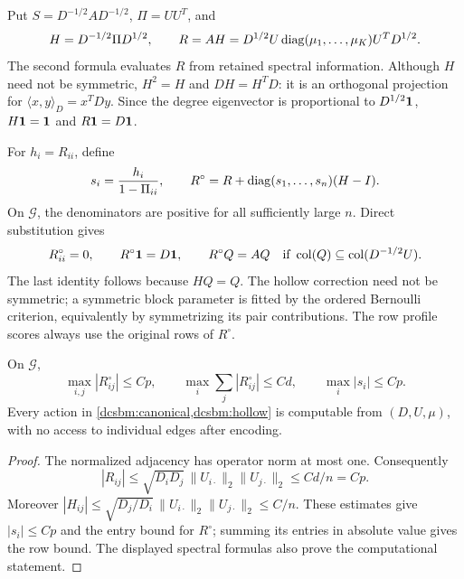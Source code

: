 Put \(S=D^{-1/2}AD^{-1/2}\), \(\Pi=UU^T\), and
\begin{equation}
 H=D^{-1/2}\Pi D^{1/2},\qquad
 R=AH=D^{1/2}U\operatorname{diag}(\mu_1,\ldots,\mu_K)U^TD^{1/2}.
 \label{dcsbm:canonical}
\end{equation}
The second formula evaluates \(R\) from retained spectral information.
Although \(H\) need not be symmetric, \(H^2=H\) and \(DH=H^TD\):
it is an orthogonal projection for
\(\langle x,y\rangle_D=x^TDy\).  Since the degree eigenvector
is proportional to \(D^{1/2}\mathbf 1\), \(H\mathbf 1=\mathbf 1\) and
\(R\mathbf 1=D\mathbf 1\).

For \(h_i=R_{ii}\), define
\begin{equation}
 s_i=\frac{h_i}{1-\Pi_{ii}},\qquad
 R^\circ=R+\operatorname{diag}(s_1,\ldots,s_n)(H-I).
 \label{dcsbm:hollow}
\end{equation}
On \(\mathcal G\), the denominators are positive for all sufficiently
large \(n\).  Direct substitution gives
\begin{equation}
 R^\circ_{ii}=0,\qquad R^\circ\mathbf 1=D\mathbf 1,\qquad
 R^\circ Q=AQ\quad
 \text{if }\operatorname{col}(Q)\subseteq\operatorname{col}(D^{-1/2}U).
 \label{dcsbm:exact-identities}
\end{equation}
The last identity follows because \(HQ=Q\).  The hollow correction need
not be symmetric; a symmetric block parameter is fitted by the ordered
Bernoulli criterion, equivalently by symmetrizing its pair contributions.
The row profile scores always use the original rows of \(R^\circ\).

\begin{lemma}
\label{dcsbm:entry-lemma}
On \(\mathcal G\),
\begin{equation}
 \max_{i,j}|R^\circ_{ij}|\le Cp,\qquad
 \max_i\sum_j|R^\circ_{ij}|\le Cd,\qquad
 \max_i|s_i|\le Cp .
 \label{dcsbm:entry-bounds}
\end{equation}
Every action in \cref{dcsbm:canonical,dcsbm:hollow} is computable from
\((D,U,\mu)\), with no access to individual edges after encoding.
\end{lemma}

\begin{proof}
The normalized adjacency has operator norm at most one.  Consequently
\[
 |R_{ij}|
 \le \sqrt{D_iD_j}\,\|U_{i\cdot}\|_2\|U_{j\cdot}\|_2
 \le Cd/n=Cp.
\]
Moreover
\(
 |H_{ij}|
 \le\sqrt{D_j/D_i}\,\|U_{i\cdot}\|_2\|U_{j\cdot}\|_2
 \le C/n
\).
These estimates give \(|s_i|\le Cp\) and the entry bound for \(R^\circ\);
summing its entries in absolute value gives the row bound.
The displayed spectral formulas also prove the computational statement.
\end{proof}

